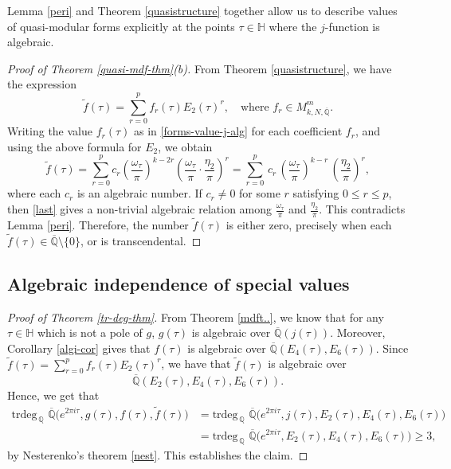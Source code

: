 \documentclass[11pt, reqno]{amsart}
\begin{document}
Lemma \ref{peri} and Theorem \ref{quasistructure} together allow us to describe values of quasi-modular forms explicitly at the points $\tau\in\mathbb{H}$ where the $j$-function is algebraic.
\begin{proof}[Proof of Theorem \ref{quasi-mdf-thm}(b)]
From Theorem \ref{quasistructure}, we have the expression $$\widetilde{f}(\tau)=\sum_{r=0}^p f_r(\tau) E_2(\tau)^r,\quad \text{where } f_r\in M^m_{k,N,\overline{\mathbb{Q}}}.$$
Writing the value $f_r(\tau)$ as in \eqref{forms-value-j-alg} for each coefficient $f_r$, and using the above formula for $E_2$, we obtain
\begin{equation}\label{last}
\widetilde{f}(\tau)=\sum_{r=0}^p c_r\left(\frac{\omega_\tau}{\pi}\right)^{k-2 r}\left(\frac{\omega_\tau}{\pi}\cdot\frac{\eta_2}{\pi}\right)^r=\sum_{r=0}^p\, c_r\, \left(\frac{\omega_\tau}{\pi}\right)^{k-r}\, \left(\frac{\eta_2}{\pi}\right)^r,
 \end{equation}
where each $c_r$ is an algebraic number. If  $c_r \neq 0$ for some $r$ satisfying $0 \leq r \leq p$, then \eqref{last} gives a non-trivial algebraic relation among $\frac{\omega_\tau}{\pi}$ and $\frac{\eta_2}{\pi}$. This contradicts Lemma \ref{peri}. Therefore, the number $\widetilde{f}(\tau)$ is either zero, precisely when each $\widetilde{f}(\tau)\in\overline{\mathbb{Q}}\setminus \{0\}$, or is transcendental.     
\end{proof}


\bigskip

\subsection{Algebraic independence of special values}

\begin{proof}[Proof of Theorem \ref{tr-deg-thm}]
From Theorem \ref{mdft..}, we know that for any $\tau \in \mathbb{H}$ which is not a pole of $g$, $g(\tau)$ is algebraic over $\overline{\mathbb{Q}}(j(\tau))$. Moreover, Corollary \ref{algi-cor} gives that $f(\tau)$ is algebraic over $\overline{\mathbb{Q}}(E_4(\tau), E_6(\tau))$. Since $\widetilde{f}(\tau)=\sum_{r=0}^p f_r(\tau) E_2(\tau)^r$, we have that $\widetilde{f}(\tau)$ is algebraic over $${\overline{\mathbb{Q}}(E_2(\tau), E_4(\tau), E_6(\tau)).}$$ Hence, we get that
\begin{align*}
    \text{trdeg}_{\, \mathbb{Q}} \, \, \overline{\mathbb{Q}} \bigg(e^{2 \pi i \tau}, g(\tau), f(\tau), \widetilde{f}(\tau) \bigg) & = \text{trdeg}_{\, \mathbb{Q}} \, \, \overline{\mathbb{Q}} \bigg(e^{2 \pi i \tau}, j(\tau), E_2(\tau), E_4(\tau), E_6(\tau) \bigg) \\
    & = \text{trdeg}_{\, \mathbb{Q}} \, \, \overline{\mathbb{Q}} \bigg(e^{2 \pi i \tau}, E_2(\tau), E_4(\tau), E_6(\tau) \bigg) \geq 3,
\end{align*}
by Nesterenko's theorem \ref{nest}. This establishes the claim.
\end{proof}
\end{document}
